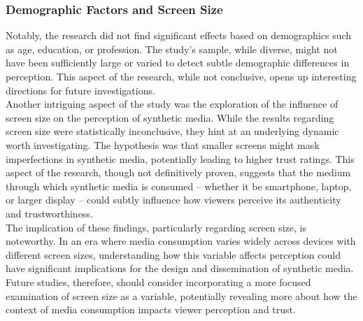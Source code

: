 \documentclass[
  a4paper,  %
  twoside,  %
  bibliography=totoc,
  headsepline,
  cleardoublepage=empty,
  parskip=half,
  draft=false
]{scrbook}
\begin{document}
\subsubsection{Demographic Factors and Screen Size}
Notably, the research did not find significant effects based on demographics such as age, education, or profession. The study's sample, while diverse, might not have been sufficiently large or varied to detect subtle demographic differences in perception. This aspect of the research, while not conclusive, opens up interesting directions for future investigations. \\
Another intriguing aspect of the study was the exploration of the influence of screen size on the perception of synthetic media. While the results regarding screen size were statistically inconclusive, they hint at an underlying dynamic worth investigating. The hypothesis was that smaller screens might mask imperfections in synthetic media, potentially leading to higher trust ratings. This aspect of the research, though not definitively proven, suggests that the medium through which synthetic media is consumed – whether it be smartphone, laptop, or larger display – could subtly influence how viewers perceive its authenticity and trustworthiness. \\
The implication of these findings, particularly regarding screen size, is noteworthy. In an era where media consumption varies widely across devices with different screen sizes, understanding how this variable affects perception could have significant implications for the design and dissemination of synthetic media. Future studies, therefore, should consider incorporating a more focused examination of screen size as a variable, potentially revealing more about how the context of media consumption impacts viewer perception and trust.
\end{document}
